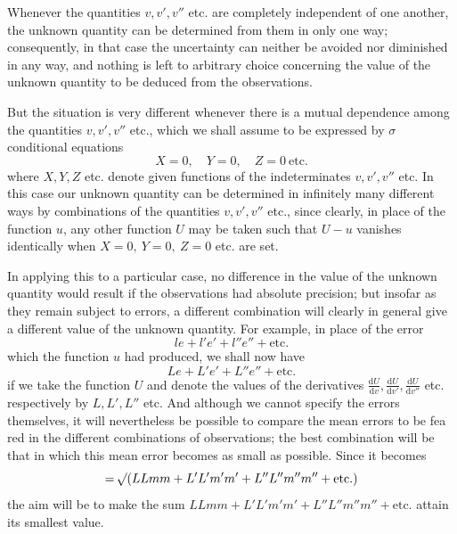 Whenever the quantities \(v,v',v''\) etc. are completely independent of one another, the unknown quantity can be determined from them in only one way; consequently, in that case the uncertainty can neither be avoided nor diminished in any way, and nothing is left to arbitrary choice concerning the value of the unknown quantity to be deduced from the observations.

But the situation is very different whenever there is a mutual dependence among the quantities \(v,v',v''\) etc., which we shall assume to be expressed by \(\sigma\) conditional equations
\[
X=0,\quad Y=0,\quad Z=0\ \text{etc.}
\]
where \(X,Y,Z\) etc. denote given functions of the indeterminates \(v,v',v''\) etc. In this case our unknown quantity can be determined in infinitely many different ways by combinations of the quantities \(v,v',v''\) etc., since clearly, in place of the function \(u\), any other function \(U\) may be taken such that \(U-u\) vanishes identically when \(X=0,\ Y=0,\ Z=0\) etc. are set.

In applying this to a particular case, no difference in the value of the unknown quantity would result if the observations had absolute precision; but insofar as they remain subject to errors, a different combination will clearly in general give a different value of the unknown quantity. For example, in place of the error
\[
le+l'e'+l''e''+\text{etc.}
\]
which the function \(u\) had produced, we shall now have
\[
Le+L'e'+L''e''+\text{etc.}
\]
if we take the function \(U\) and denote the values of the derivatives \(\frac{\mathrm dU}{\mathrm dv},\frac{\mathrm dU}{\mathrm dv'},\frac{\mathrm dU}{\mathrm dv''}\) etc. respectively by \(L,L',L''\) etc. And although we cannot specify the errors themselves, it will nevertheless be possible to compare the mean errors to be fea%
%
red in the different combinations of observations; the best combination will be that in which this mean error becomes as small as possible. Since it becomes
\[
=\mathord{{}^{}\!\surd}(LLmm+L'L'm'm'+L''L''m''m''+\text{etc.})
\]
the aim will be to make the sum \(LLmm+L'L'm'm'+L''L''m''m''+\text{etc.}\) attain its smallest value.

